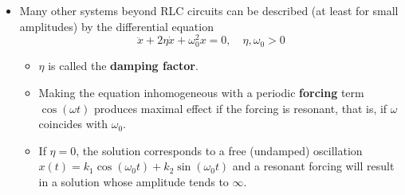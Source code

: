 \documentclass[../notes.tex]{subfiles}
\begin{document}
\begin{itemize}
    \item Many other systems beyond RLC circuits can be described (at least for small amplitudes) by the differential equation
    \begin{equation*}
        \ddot{x}+2\eta\dot{x}+\omega_0^2x = 0
        ,\quad
        \eta,\omega_0 > 0
    \end{equation*}
    \begin{itemize}
        \item $\eta$ is called the \textbf{damping factor}.
        \item Making the equation inhomogeneous with a periodic \textbf{forcing} term $\cos(\omega t)$ produces maximal effect if the forcing is resonant, that is, if $\omega$ coincides with $\omega_0$.
        \item If $\eta=0$, the solution corresponds to a free (undamped) oscillation $x(t)=k_1\cos(\omega_0t)+k_2\sin(\omega_0t)$ and a resonant forcing will result in a solution whose amplitude tends to $\infty$.
    \end{itemize}
\end{itemize}
\end{document}
